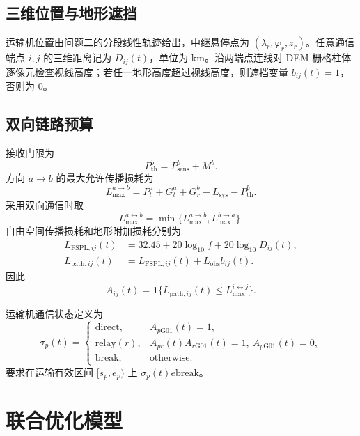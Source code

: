 \documentclass[UTF8,a4paper,12pt]{ctexart}
\newcommand{\Gone}{\mathrm{G01}}
\begin{document}
\subsection{三维位置与地形遮挡}
运输机位置由问题二的分段线性轨迹给出，中继悬停点为 $(\lambda_r,\varphi_r,z_r)$。任意通信端点 $i,j$ 的三维距离记为 $D_{ij}(t)$，单位为 km。沿两端点连线对 DEM 栅格柱体逐像元检查视线高度；若任一地形高度超过视线高度，则遮挡变量 $b_{ij}(t)=1$，否则为 $0$。

\subsection{双向链路预算}
接收门限为
\begin{equation}
 P_{\mathrm{th}}^b=P_{\mathrm{sens}}^b+M^b .
\end{equation}
方向 $a\to b$ 的最大允许传播损耗为
\begin{equation}
 L_{\max}^{a\to b}=P_t^a+G_t^a+G_r^b-L_{\mathrm{sys}}-P_{\mathrm{th}}^b .
\end{equation}
采用双向通信时取
\begin{equation}
 L_{\max}^{a\leftrightarrow b}=\min\{L_{\max}^{a\to b},L_{\max}^{b\to a}\}.
\end{equation}
自由空间传播损耗和地形附加损耗分别为
\begin{align}
 L_{\mathrm{FSPL},ij}(t)&=32.45+20\log_{10}f+20\log_{10}D_{ij}(t),\\
 L_{\mathrm{path},ij}(t)&=L_{\mathrm{FSPL},ij}(t)+L_{\mathrm{obs}}b_{ij}(t).
\end{align}
因此
\begin{equation}
 A_{ij}(t)=\mathbf 1\{L_{\mathrm{path},ij}(t)\le L_{\max}^{i\leftrightarrow j}\}.
\end{equation}

运输机通信状态定义为
\begin{equation}
 \sigma_p(t)=
 \begin{cases}
 \mathrm{direct},&A_{p\Gone}(t)=1,\\
 \mathrm{relay}(r),&A_{p r}(t)A_{r\Gone}(t)=1,\ A_{p\Gone}(t)=0,\\
 \mathrm{break},&\text{otherwise}.
 \end{cases}
\end{equation}
要求在运输有效区间 $[s_p,e_p)$ 上 $\sigma_p(t)
e\mathrm{break}$。

\section{联合优化模型}
\end{document}
